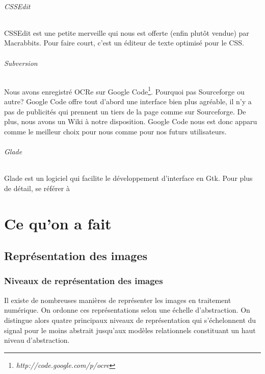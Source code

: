 \documentclass[]{report}
\begin{document}
			\paragraph{CSSEdit} %
			\label{par:cssedit}
			CSSEdit est une petite merveille qui nous est offerte (enfin plut\^ot vendue) par Macrabbits. Pour faire court, c'est un \'editeur de texte optimis\'e pour le CSS.
			\paragraph{Subversion\\} %
			\label{par:subversion}
				Nous avons enregistr\'e OCRe sur Google Code\footnote{\emph{http://code.google.com/p/ocre}}. Pourquoi pas Sourceforge ou autre? Google Code offre tout d'abord une interface bien plus agr\'eable, il n'y a pas de publicit\'es qui prennent un tiers de la page comme sur Sourceforge. De plus, nous avons un Wiki \`a notre disposition. Google Code nous est donc apparu comme le meilleur choix pour nous comme pour nos futurs utilisateurs.
			\paragraph{Glade} %
				Glade est un logiciel qui facilite le d\'eveloppement d'interface en Gtk. Pour plus de d\'etail, se r\'ef\'erer \`a %
			\label{par:glade}





\part{Ce qu'on a fait} %
\label{prt:ce_qu_on_a_fait}


  \chapter{Repr\'esentation des images} %
	\label{cha:repr'esentation_des_images}


    \section{Niveaux de repr\'esentation des images} %
    \label{sec:niveaux_de_repr'esentation_des_images}
  		Il existe de nombreuses manières de représenter les images en traitement numérique. On ordonne ces représentations selon une échelle d'abstraction. On distingue alors quatre principaux niveaux de représentation qui s'échelonnent du signal pour le moins abstrait jusqu'aux modèles relationnels constituant un haut niveau d'abstraction.
\end{document}

